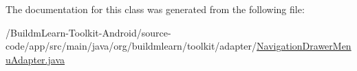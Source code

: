 The documentation for this class was generated from the following file\-:\begin{DoxyCompactItemize}
\item 
/\-Buildm\-Learn-\/\-Toolkit-\/\-Android/source-\/code/app/src/main/java/org/buildmlearn/toolkit/adapter/\hyperlink{NavigationDrawerMenuAdapter_8java}{Navigation\-Drawer\-Menu\-Adapter.\-java}\end{DoxyCompactItemize}
